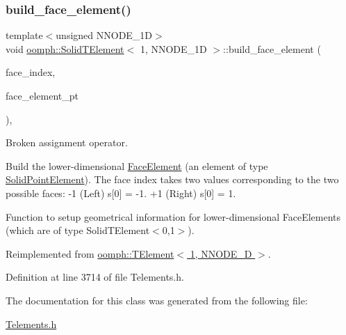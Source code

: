 \subsubsection{\texorpdfstring{build\+\_\+face\+\_\+element()}{build\_face\_element()}}
{\footnotesize\ttfamily template$<$unsigned N\+N\+O\+D\+E\+\_\+1D$>$ \\
void \hyperlink{classoomph_1_1SolidTElement}{oomph\+::\+Solid\+T\+Element}$<$ 1, N\+N\+O\+D\+E\+\_\+1D $>$\+::build\+\_\+face\+\_\+element (\begin{DoxyParamCaption}\item[{const int \&}]{face\+\_\+index,  }\item[{\hyperlink{classoomph_1_1FaceElement}{Face\+Element} $\ast$}]{face\+\_\+element\+\_\+pt }\end{DoxyParamCaption})\hspace{0.3cm}{\ttfamily [inline]}, {\ttfamily [virtual]}}



Broken assignment operator. 

Build the lower-\/dimensional \hyperlink{classoomph_1_1FaceElement}{Face\+Element} (an element of type \hyperlink{classoomph_1_1SolidPointElement}{Solid\+Point\+Element}). The face index takes two values corresponding to the two possible faces\+: -\/1 (Left) s\mbox{[}0\mbox{]} = -\/1. +1 (Right) s\mbox{[}0\mbox{]} = 1.

Function to setup geometrical information for lower-\/dimensional Face\+Elements (which are of type Solid\+T\+Element$<$0,1$>$). 

Reimplemented from \hyperlink{classoomph_1_1TElement_3_011_00_01NNODE__1D_01_4_af114adb1980d2863b72b9372bc058e3c}{oomph\+::\+T\+Element$<$ 1, N\+N\+O\+D\+E\+\_\+D $>$}.



Definition at line 3714 of file Telements.\+h.



The documentation for this class was generated from the following file\+:\begin{DoxyCompactItemize}
\item 
\hyperlink{Telements_8h}{Telements.\+h}\end{DoxyCompactItemize}

